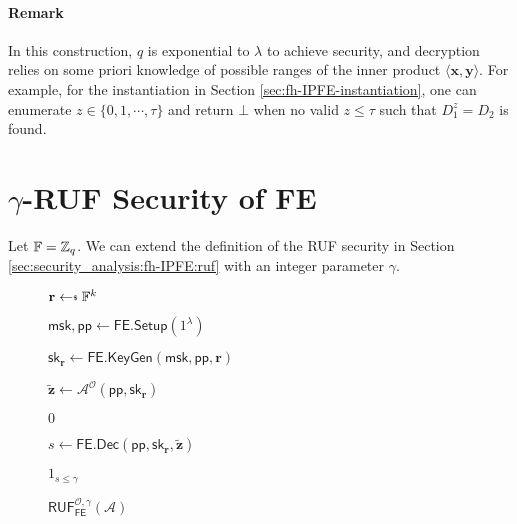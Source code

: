 \paragraph{Remark}
In this construction, $q$ is exponential to $\lambda$ to achieve security, and decryption relies on some priori knowledge of possible ranges of the inner product $\langle \mathbf{x}, \mathbf{y} \rangle$. For example, for the instantiation in Section \ref{sec:fh-IPFE-instantiation}, one can enumerate $z \in \{0, 1, \cdots, \tau \}$ and return $\bot$ when no valid $z \leq \tau$ such that $D_1^z = D_2$ is found.


\newpage


\section{$\gamma$-RUF Security of \textsf{FE}}

Let $\mathbb{F} = \mathbb{Z}_q$. We can extend the definition of the RUF security in Section \ref{sec:security_analysis:fh-IPFE:ruf} with an integer parameter $\gamma$.

\begin{figure}[H]
\centering

	\begin{minipage}[t]{0.55\textwidth}
	\begin{algorithm}[H]
	\caption{$\textsf{RUF}^{\mathcal{O}, \gamma}_{\textsf{FE}}(\mathcal{A})$}
	\label{alg:gamma-ruf-fh-IPFE}
	\begin{algorithmic}[1]
		\State $\mathbf{r} \getsdollar \mathbb{F}^{k}$

		\State $\textsf{msk}, \textsf{pp} \gets \textsf{FE.Setup}(1^\lambda)$

		\State $\textsf{sk}_{\mathbf{r}} \gets \textsf{FE.KeyGen}(\textsf{msk}, \textsf{pp}, \mathbf{r})$

		\State $\mathbf{\tilde{z}} \gets \mathcal{A}^{\mathcal{O}} ( \textsf{pp}, \textsf{sk}_{\mathbf{r}} )$

			
			\State \Return $0$
		
		\EndIf

		\State $s \gets \textsf{FE.Dec}(\textsf{pp}, \textsf{sk}_{\mathbf{r}}, \mathbf{\tilde{z}} )$

		\State \Return $1_{s \leq \gamma}$
	\end{algorithmic}
	\end{algorithm}
	\end{minipage}

\end{figure}

